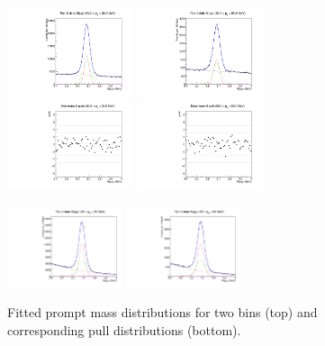 \begin{figure}[hb!]
\centering
\includegraphics[width=0.33\textwidth]{Figures/chapter4/Pfit_pt2.pdf}
\includegraphics[width=0.33\textwidth]{Figures/chapter4/Pfit_pt5.pdf}\\
\includegraphics[width=0.33\textwidth]{Figures/chapter4/Ppulls_pt2.pdf}
\includegraphics[width=0.33\textwidth]{Figures/chapter4/Ppulls_pt5.pdf}
\caption{Fitted prompt \psip mass distributions for two \pt bins (top) 
and corresponding pull distributions (bottom).}
\label{fig:mass-fits-psip-PR}
%
\centering
\includegraphics[width=0.3\textwidth]{Figures/chapter4/Nfit_pt2.pdf}
\includegraphics[width=0.3\textwidth]{Figures/chapter4/Nfit_pt5.pdf}\\

\end{figure}
